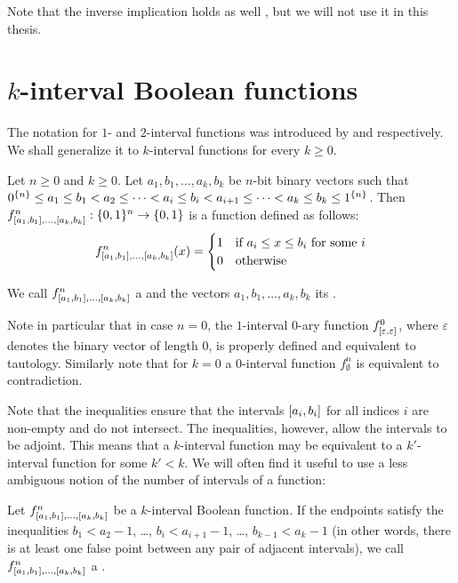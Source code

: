 Note that the inverse implication holds as well
\citep[Lemma 3.7]{Cepek2012},
but we will not use it in this thesis.

\section{\texorpdfstring{$k$}{k}-interval
Boolean functions}

The notation for $1$- and $2$-interval
functions was introduced by \citeauthor{Schieber2005154}
and \citeauthor{Dubovsky2012} respectively.
We shall generalize it to $k$-interval functions
for every $k \geq 0$.

\begin{definition}
\label{def:kibf}
Let $n \geq 0$ and $k \geq 0$.
Let $a_1, b_1, \ldots, a_k, b_k$ be $n$-bit binary vectors
such that $0^{\{n\}} \leq a_1 \leq b_1 < a_2
\leq \cdots < a_i \leq b_i < a_{i+1}
\leq \cdots < a_k \leq b_k \leq 1^{\{n\}}$.
Then $f^{n}_{[a_1, b_1], \ldots, [a_{k}, b_{k}]}: \{0, 1\}{}^n \rightarrow \{0, 1\}{}$ is a function defined as follows:
$$
f^{n}_{[a_1, b_1], \ldots, [a_{k}, b_{k}]}(x) =
\begin{cases}
1 & \text{if } a_i \leq x \leq b_i \text{ for some } i \\
0 & \text{otherwise}
\end{cases}
$$

We call
$f^n_{[a_1, b_1], \ldots, [a_k, b_k]}$
a 
and the vectors $a_1, b_1, \ldots, a_k, b_k$ its
.
\end{definition}

Note in particular that in case $n=0$,
the $1$-interval $0$-ary function
$f^{0}_{[\varepsilon, \varepsilon]}$,
where $\varepsilon$ denotes the binary vector of length $0$,
is properly defined and equivalent to tautology.
Similarly note that for $k=0$
a $0$-interval function $f^n_{\emptyset}$
is equivalent to contradiction.

Note that the inequalities ensure
that the intervals $[a_i, b_i]$ for all indices $i$
are non-empty and do not intersect.
The inequalities, however, allow the intervals to be adjoint.
This means that a $k$-interval function
may be equivalent to a $k'$-interval function
for some $k' < k$.
We will often find it useful to use a less ambiguous notion of the number of intervals of a function:
\begin{definition}
\label{def:properkibf}
Let
$f^n_{[a_1, b_1], \ldots, [a_k, b_k]}$
be a $k$-interval Boolean function.
If the endpoints satisfy the inequalities
$b_1 < a_2 - 1$, \ldots, $b_i < a_{i+1} - 1$, \ldots,
$b_{k-1} < a_k - 1$
(in other words,
there is at least one false point
between any pair of adjacent intervals),
we call
$f^n_{[a_1, b_1], \ldots, [a_k, b_k]}$
a .
\end{definition}

